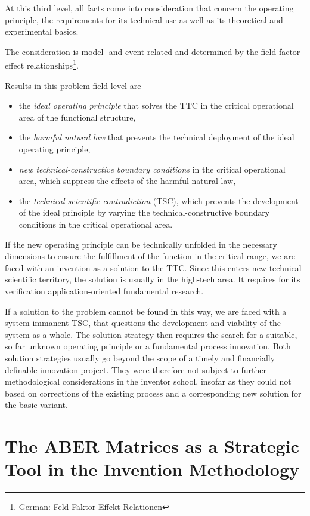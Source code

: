 \documentclass[11pt,a4paper]{article}
\begin{document}
At this third level, all facts come into consideration that concern the
operating principle, the requirements for its technical use as well as its
theoretical and experimental basics.

The consideration is model- and event-related and determined by the
field-factor-effect relationships\footnote{German:
  Feld-Faktor-Effekt-Relationen}.

Results in this problem field level are
\begin{itemize}
\item the \emph{ideal operating principle} that solves the TTC in the critical
  operational area of the functional structure,
\item the \emph{harmful natural law} that prevents the technical deployment of
  the ideal operating principle,
\item \emph{new technical-constructive boundary conditions} in the critical
  operational area, which suppress the effects of the harmful natural law,
\item the \emph{technical-scientific contradiction} (TSC), which prevents the
  development of the ideal principle by varying the technical-constructive
  boundary conditions in the critical operational area.
\end{itemize}
If the new operating principle can be technically unfolded in the necessary
dimensions to ensure the fulfillment of the function in the critical range, we
are faced with an invention as a solution to the TTC.  Since this enters new
technical-scientific territory, the solution is usually in the high-tech
area. It requires for its verification application-oriented fundamental
research.

If a solution to the problem cannot be found in this way, we are faced with a
system-immanent TSC, that questions the development and viability of the
system as a whole. The solution strategy then requires the search for a
suitable, so far unknown operating principle or a fundamental process
innovation. Both solution strategies usually go beyond the scope of a timely
and financially definable innovation project. They were therefore not subject
to further methodological considerations in the inventor school, insofar as
they could not based on corrections of the existing process and a
corresponding new solution for the basic variant.

\section{The ABER Matrices as a Strategic Tool in the Invention Methodology}
\end{document}
